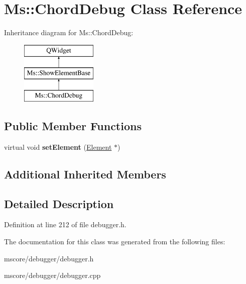 \hypertarget{class_ms_1_1_chord_debug}{}\section{Ms\+:\+:Chord\+Debug Class Reference}
\label{class_ms_1_1_chord_debug}
Inheritance diagram for Ms\+:\+:Chord\+Debug\+:\begin{figure}[H]
\begin{center}
\leavevmode
\includegraphics[height=3.000000cm]{class_ms_1_1_chord_debug}
\end{center}
\end{figure}
\subsection*{Public Member Functions}
\begin{DoxyCompactItemize}
\item 
\mbox{\label{class_ms_1_1_chord_debug_af423251a02fbae9df007c3814678aa0b}} 
virtual void {\bfseries set\+Element} (\hyperlink{class_ms_1_1_element}{Element} $\ast$)
\end{DoxyCompactItemize}
\subsection*{Additional Inherited Members}


\subsection{Detailed Description}


Definition at line 212 of file debugger.\+h.



The documentation for this class was generated from the following files\+:\begin{DoxyCompactItemize}
\item 
mscore/debugger/debugger.\+h\item 
mscore/debugger/debugger.\+cpp\end{DoxyCompactItemize}

